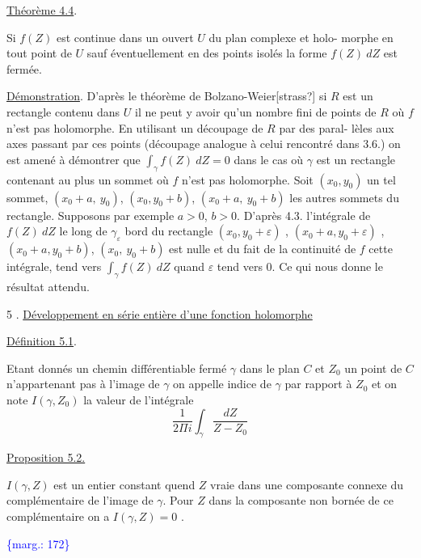\documentclass[11pt]{article}
\newcommand{\scanpage}[1]{\par\bigskip\noindent{\small\sffamily[scan #1]}\par}
\newcommand{\mspage}[1]{{\small\sffamily[p.\,#1]}}
\newcommand{\margin}[1]{\textcolor{blue}{\{\textsf{marg.:} #1\}}}
\newcommand{\uline}[1]{\underline{#1}}
\newcommand{\unsure}[1]{[#1?]}
\begin{document}
\clearpage
\scanpage{119/172}
\mspage{- 11 -}

\uline{Théorème 4.4}.

Si $f(Z)$ est continue dans un ouvert $U$ du plan complexe et holo-%
morphe en tout point de $U$ sauf éventuellement en des points isolés la forme
$f(Z)\ dZ$ est fermée.

\uline{Démonstration}. D'après le théorème de Bolzano-Weier\unsure{strass} si $R$ est un
rectangle contenu dans $U$ il ne peut y avoir qu'un nombre fini de points de
$R$ où $f$ n'est pas holomorphe. En utilisant un découpage de $R$ par des paral-%
lèles aux axes passant par ces points (découpage analogue à celui rencontré
dans 3.6.) on est amené à démontrer que $\int_{\gamma} f(Z)\ dZ = 0$ dans le cas où $\gamma$
est un rectangle contenant au plus un sommet où $f$ n'est pas holomorphe. Soit
$(x_0,y_0)$ un tel sommet, $(x_0+a,\ y_0)$, $(x_0,y_0+b)$, $(x_0+a,\ y_0+b)$ les autres sommets
du rectangle. Supposons par exemple $a > 0$, $b > 0$. D'après 4.3. l'intégrale
de $f(Z)\ dZ$ le long de $\gamma_{\varepsilon}$ bord du rectangle $(x_0,y_0+\varepsilon)$ , $(x_0+a,y_0+\varepsilon)$ ,
$(x_0+a,y_0+b)$, $(x_0,\ y_0+b)$ est nulle et du fait de la continuité de $f$ cette
intégrale, tend vers $\int_{\gamma} f(Z)\ dZ$ quand $\varepsilon$ tend vers 0. Ce qui nous donne le
résultat attendu.

5 . \uline{Développement en série entière d'une fonction holomorphe}

\uline{Définition 5.1}.

Etant donnés un chemin différentiable fermé $\gamma$ dans le plan $C$ et
$Z_0$ un point de $C$ n'appartenant pas à l'image de $\gamma$ on appelle indice de $\gamma$
par rapport à $Z_0$ et on note $I(\gamma,Z_0)$ la valeur de l'intégrale
\[ \frac{1}{2\Pi i} \int_{\gamma} \frac{dZ}{Z-Z_0} \]

\uline{Proposition 5.2.}

$I(\gamma,Z)$ est un entier constant quend $Z$ vraie dans une composante
connexe du complémentaire de l'image de $\gamma$. Pour $Z$ dans la composante non
bornée de ce complémentaire on a $I(\gamma,Z) = 0$ .

\margin{172}
\end{document}
